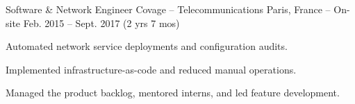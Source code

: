\begin{cventries}
\cventry
  {Software \& Network Engineer}
  {Covage – Telecommunications}
  {Paris, France – On-site}
  {Feb. 2015 – Sept. 2017 (2 yrs 7 mos)}
  {
    \begin{cvitems}
      \item {Automated network service deployments and configuration audits.}
      \item {Implemented infrastructure-as-code and reduced manual operations.}
      \item {Managed the product backlog, mentored interns, and led feature development.}
    \end{cvitems}
  }

\end{cventries}
